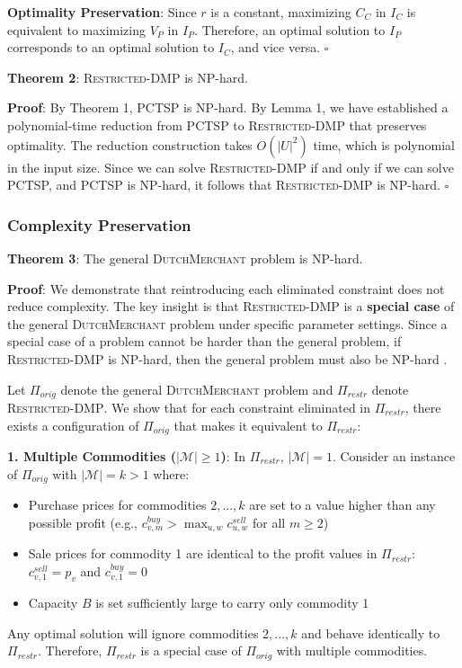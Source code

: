 \documentclass[12pt]{article}
\begin{document}
\textbf{Optimality Preservation}: Since $r$ is a constant, maximizing $C_C$ in $I_C$ is equivalent to maximizing $V_P$ in $I_P$. Therefore, an optimal solution to $I_P$ corresponds to an optimal solution to $I_C$, and vice versa. \hfill $\square$

\textbf{Theorem 2}: \textsc{Restricted-DMP} is NP-hard.

\textbf{Proof}: By Theorem 1, PCTSP is NP-hard. By Lemma 1, we have established a polynomial-time reduction from PCTSP to \textsc{Restricted-DMP} that preserves optimality. The reduction construction takes $O(|U|^2)$ time, which is polynomial in the input size. Since we can solve \textsc{Restricted-DMP} if and only if we can solve PCTSP, and PCTSP is NP-hard, it follows that \textsc{Restricted-DMP} is NP-hard. \hfill $\square$

\subsubsection{Complexity Preservation}

\textbf{Theorem 3}: The general \textsc{DutchMerchant} problem is NP-hard.

\textbf{Proof}: We demonstrate that reintroducing each eliminated constraint does not reduce complexity. The key insight is that \textsc{Restricted-DMP} is a \textbf{special case} of the general \textsc{DutchMerchant} problem under specific parameter settings. Since a special case of a problem cannot be harder than the general problem, if \textsc{Restricted-DMP} is NP-hard, then the general problem must also be NP-hard \cite{garey1979}.

Let $\Pi_{orig}$ denote the general \textsc{DutchMerchant} problem and $\Pi_{restr}$ denote \textsc{Restricted-DMP}. We show that for each constraint eliminated in $\Pi_{restr}$, there exists a configuration of $\Pi_{orig}$ that makes it equivalent to $\Pi_{restr}$:

\textbf{1. Multiple Commodities ($|\mathcal{M}| \geq 1$)}: In $\Pi_{restr}$, $|\mathcal{M}| = 1$. Consider an instance of $\Pi_{orig}$ with $|\mathcal{M}| = k > 1$ where:
\begin{itemize}
    \item Purchase prices for commodities $2, ..., k$ are set to a value higher than any possible profit (e.g., $c^{buy}_{v,m} > \max_{u,w} c^{sell}_{u,w}$ for all $m \geq 2$)
    \item Sale prices for commodity 1 are identical to the profit values in $\Pi_{restr}$: $c^{sell}_{v,1} = p_v$ and $c^{buy}_{v,1} = 0$
    \item Capacity $B$ is set sufficiently large to carry only commodity 1
\end{itemize}
Any optimal solution will ignore commodities $2, ..., k$ and behave identically to $\Pi_{restr}$. Therefore, $\Pi_{restr}$ is a special case of $\Pi_{orig}$ with multiple commodities.
\end{document}
